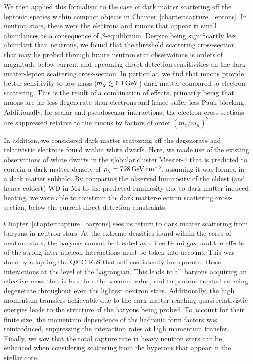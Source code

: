 We then applied this formalism to the case of dark matter scattering off the leptonic species within compact objects in Chapter~\ref{chapter:capture_leptons}. In neutron stars, these were the electrons and muons that appear in small abundances as a consequence of $\beta$-equilibrium. Despite being significantly less abundant than neutrons, we found that the threshold scattering cross-section that may be probed through future neutron star observations is orders of magnitude below current and upcoming direct detection sensitivities on the dark matter-lepton scattering cross-section. In particular, we find that muons provide better sensitivity to low mass ($m_\chi\lesssim 0.1{\rm \,GeV}$) dark matter compared to electron scattering. This is the result of a combination of effects, primarily being that muons are far less degenerate than electrons and hence suffer less Pauli blocking. Additionally, for scalar and pseudoscalar interactions, the electron cross-sections are suppressed relative to the muons by factors of order  $(m_e/m_\mu)^2$. 

In addition, we considered dark matter scattering off the degenerate and relativistic electrons found within white dwarfs.  Here, we made use of the existing observations of white dwarfs in the globular cluster Messier-4 that is predicted to contain a dark matter density of $\rho_\chi = 798{\rm \,GeV} {\rm \,cm}^{-3}$, assuming it was formed in a dark matter subhalo. By comparing the observed luminosity of the oldest (and hence coldest) WD in M4 to the predicted luminosity due to dark matter-induced heating, we were able to constrain the dark matter-electron scattering cross-section, below the current direct detection constraints. 

Chapter~\ref{chapter:capture_baryons} sees us return to dark matter scattering from baryons in neutron stars. At the extreme densities found within the cores of neutron stars, the baryons cannot be treated as a free Fermi gas, and the effects of the strong inter-nucleon interactions must be taken into account. This was done by adopting the QMC EoS that self-consistently incorporates these interactions at the level of the Lagrangian. This leads to all baryons acquiring an effective mass that is less than the vacuum value, and to protons treated as being degenerate throughout even the lightest neutron stars. Additionally, the high momentum transfers achievable due to the dark matter reaching quasi-relativistic energies leads to the structure of the baryons being probed. To account for their finite size, the momentum dependence of the hadronic form factors was reintroduced, suppressing the interaction rates at high momentum transfer. Finally, we saw that the total capture rate in heavy neutron stars can be enhanced when considering scattering from the hyperons that appear in the stellar core. 

